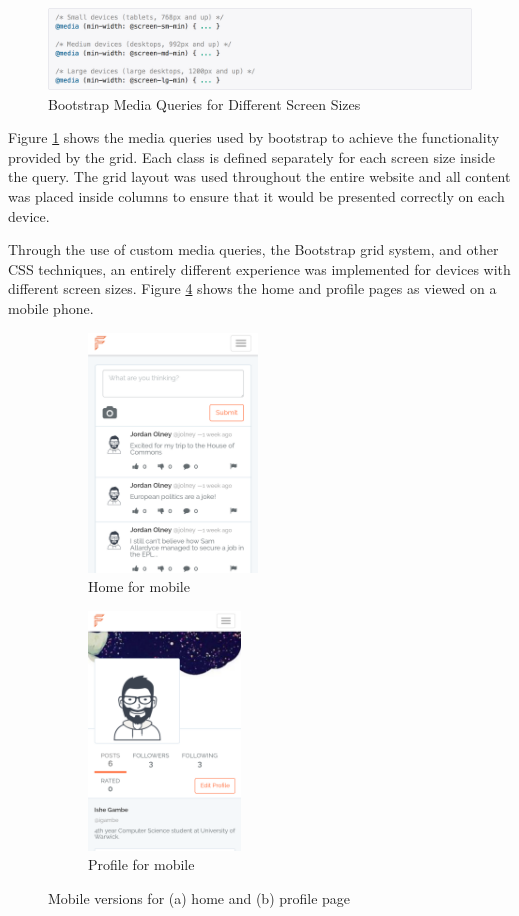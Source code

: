 \begin{figure}[H]
\centering
\includegraphics[width=1.0\textwidth]{Images/Implementation/MediaQueries}
\caption{Bootstrap Media Queries for Different Screen Sizes} \label{fig:MediaQueries}
\end{figure}

Figure \ref{fig:MediaQueries} shows the media queries used by bootstrap to achieve the functionality provided by the grid. Each class is defined separately for each screen size inside the query. The grid layout was used throughout the entire website and all content was placed inside columns to ensure that it would be presented correctly on each device.

Through the use of custom media queries, the Bootstrap grid system, and other CSS techniques, an entirely different experience was implemented for devices with different screen sizes. Figure \ref{fig:MobileView} shows the home and profile pages as viewed on a mobile phone.

\begin{figure}[H]
	\centering
	\begin{subfigure}[t]{0.45\textwidth}
		\centering
		\includegraphics[height=2.5in]{Images/Implementation/MobileHome}
		\caption{Home for mobile}\label{fig:MobileHome}		
	\end{subfigure}
	\quad
	\begin{subfigure}[t]{0.45\textwidth}
		\centering
		\includegraphics[height=2.5in]{Images/Implementation/MobileProfile}
		\caption{Profile for mobile}\label{fig:MobileProfile}
	\end{subfigure}
	\caption{Mobile versions for (a) home and (b) profile page}\label{fig:MobileView}
\end{figure}